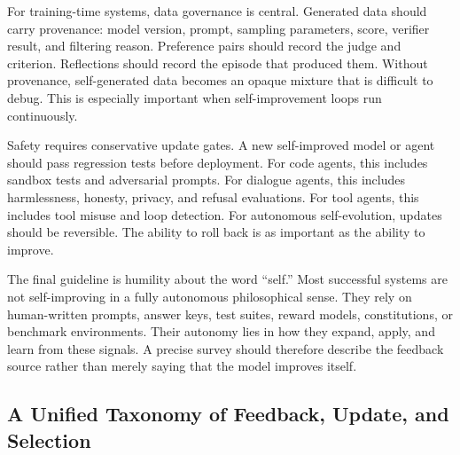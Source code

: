 For training-time systems, data governance is central. Generated data should carry provenance: model version, prompt, sampling parameters, score, verifier result, and filtering reason. Preference pairs should record the judge and criterion. Reflections should record the episode that produced them. Without provenance, self-generated data becomes an opaque mixture that is difficult to debug. This is especially important when self-improvement loops run continuously.

Safety requires conservative update gates. A new self-improved model or agent should pass regression tests before deployment. For code agents, this includes sandbox tests and adversarial prompts. For dialogue agents, this includes harmlessness, honesty, privacy, and refusal evaluations. For tool agents, this includes tool misuse and loop detection. For autonomous self-evolution, updates should be reversible. The ability to roll back is as important as the ability to improve.

The final guideline is humility about the word ``self.'' Most successful systems are not self-improving in a fully autonomous philosophical sense. They rely on human-written prompts, answer keys, test suites, reward models, constitutions, or benchmark environments. Their autonomy lies in how they expand, apply, and learn from these signals. A precise survey should therefore describe the feedback source rather than merely saying that the model improves itself.


\subsection{A Unified Taxonomy of Feedback, Update, and Selection}
\label{subsec:unified-taxonomy-feedback}

